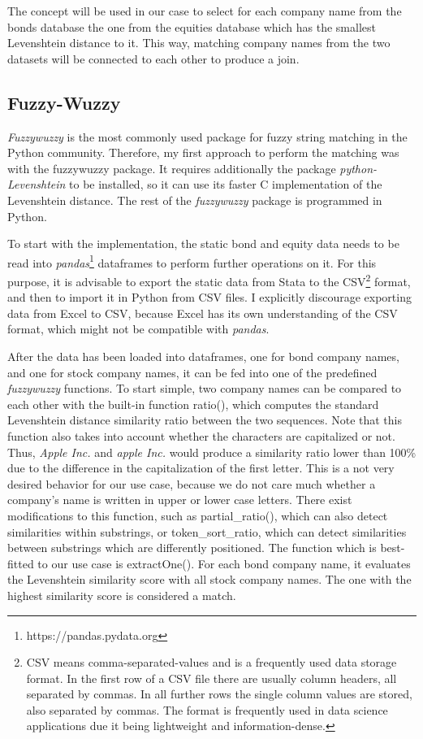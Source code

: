 The concept will be used in our case to select for each company name from the bonds database the one from the equities database which has the smallest Levenshtein distance to it. This way, matching company names from the two datasets will be connected to each other to produce a join. 

\subsection{Fuzzy-Wuzzy}
\textit{Fuzzywuzzy} is the most commonly used package for fuzzy string matching in the Python community. Therefore, my first approach to perform the matching was with the fuzzywuzzy package. It requires additionally the package \textit{python-Levenshtein} to be installed, so it can use its faster C implementation of the Levenshtein distance. The rest of the \textit{fuzzywuzzy} package is programmed in Python. 

To start with the implementation, the static bond and equity data needs to be read into \textit{pandas}\footnote{https://pandas.pydata.org} dataframes to perform further operations on it. For this purpose, it is advisable to export the static data from Stata to the CSV\footnote{CSV means comma-separated-values and is a frequently used data storage format. In the first row of a CSV file there are usually column headers, all separated by commas. In all further rows the single column values are stored, also separated by commas. The format is frequently used in data science applications due it being lightweight and information-dense. } format, and then to import it in Python from CSV files. I explicitly discourage exporting data from Excel to CSV, because Excel has its own understanding of the CSV format, which might not be compatible with \textit{pandas}. 

After the data has been loaded into dataframes, one for bond company names, and one for stock company names, it can be fed into one of the predefined \textit{fuzzywuzzy} functions. To start simple, two company names can be compared to each other with the built-in function ratio(), which computes the standard Levenshtein distance similarity ratio between the two sequences. Note that this function also takes into account whether the characters are capitalized or not. Thus, \textit{Apple Inc. }and \textit{apple Inc.} would produce a similarity ratio lower than 100\% due to the difference in the capitalization of the first letter. This is a not very desired behavior for our use case, because we do not care much whether a company's name is written in upper or lower case letters. There exist modifications to this function, such as partial\_ratio(), which can also detect similarities within substrings, or token\_sort\_ratio, which can detect similarities between substrings which are differently positioned. The function which is best-fitted to our use case is extractOne(). For each bond company name, it evaluates the Levenshtein similarity score with all stock company names. The one with the highest similarity score is considered a match. 

